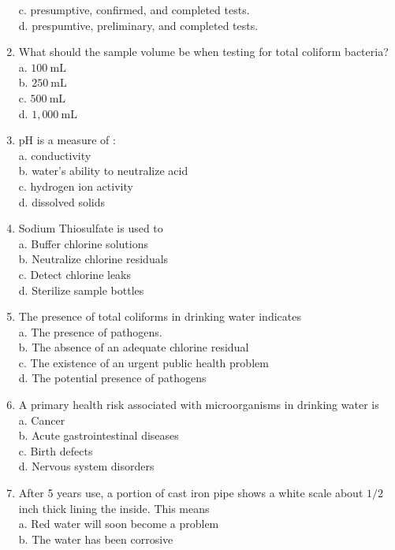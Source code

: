 \begin{enumerate}[1.]
c. presumptive, confirmed, and completed tests.\\
d. prespumtive, preliminary, and completed tests.\\
\item What should the sample volume be when testing for total coliform bacteria?\\
a. $100 \mathrm{~mL}$\\
b. $250 \mathrm{~mL}$\\
c. $500 \mathrm{~mL}$\\
d. $1,000 \mathrm{~mL}$\\
\item $\mathrm{pH}$ is a measure of :\\
a. conductivity\\
b. water's ability to neutralize acid\\
c. hydrogen ion activity\\
d. dissolved solids\\
\item Sodium Thiosulfate is used to\\
a. Buffer chlorine solutions\\
b. Neutralize chlorine residuals\\
c. Detect chlorine leaks\\
d. Sterilize sample bottles\\
\item The presence of total coliforms in drinking water indicates\\
a. The presence of pathogens.\\
b. The absence of an adequate chlorine residual\\
c. The existence of an urgent public health problem\\
d. The potential presence of pathogens\\
\item A primary health risk associated with microorganisms in drinking water is\\
a. Cancer\\
b. Acute gastrointestinal diseases\\
c. Birth defects\\
d. Nervous system disorders\\
\item After 5 years use, a portion of cast iron pipe shows a white scale about $1 / 2$ inch thick lining the inside. This means\\
a. Red water will soon become a problem\\
b. The water has been corrosive\\

\end{enumerate}
